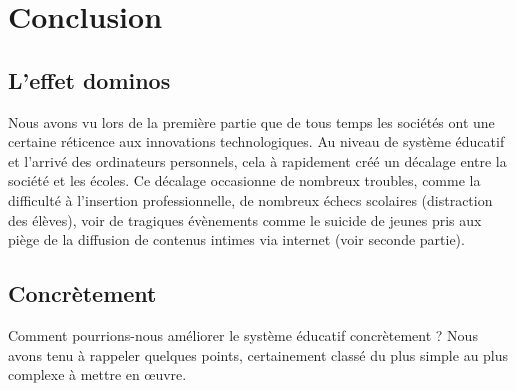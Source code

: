 
\part{Conclusion}\label{conclu}

\chapter*{L'effet dominos}
Nous avons vu lors de la première partie que de tous temps les sociétés ont une certaine réticence aux innovations technologiques. Au niveau de système éducatif et l'arrivé des ordinateurs personnels, cela à rapidement créé un décalage entre la société et les écoles. Ce décalage occasionne de nombreux troubles, comme la difficulté à l'insertion professionnelle, de nombreux échecs scolaires (distraction des élèves), voir de tragiques évènements comme le suicide de jeunes pris aux piège de la diffusion de contenus intimes via internet (voir seconde partie).

\chapter*{Concrètement}
Comment pourrions-nous améliorer le système éducatif concrètement ? Nous avons tenu à rappeler quelques points, certainement classé du plus simple au plus complexe à mettre en œuvre.

